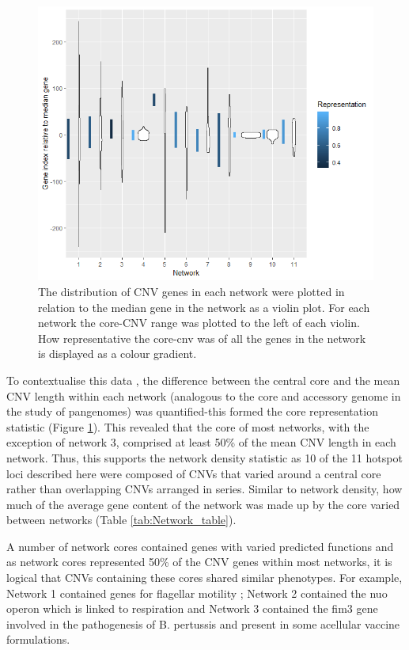 \documentclass{article}
\begin{document}
\begin{figure}[h!]
\centering
\includegraphics[width=\textwidth{}]{Chapter_1/Rplot135.png}
\caption{ The distribution of CNV genes in each network were plotted in relation to the median gene in the network as a violin plot. For each network the core-CNV range was plotted to the left of each violin. How representative the core-cnv was of all the genes in the network is displayed as a colour gradient.}
\label{fig:Core_rep}
\end{figure}



To contextualise this data , the difference between the central core and the mean CNV length within each network (analogous to the core and accessory genome in the study of pangenomes) was quantified-this formed the core representation statistic (Figure \ref{fig:Core_rep}). This revealed that the core of most networks, with the exception of network 3, comprised at least 50\% of the mean CNV length  in each network. Thus, this supports the network density statistic as  10 of the 11  hotspot loci described here were composed of CNVs that varied around a central core rather than overlapping CNVs arranged in series.  Similar to network density, how much of the average gene content of the network was made up by the core varied between networks (Table \ref{tab:Network_table}).

A number of network cores contained genes with varied predicted functions and as network cores represented 50\% of the CNV genes within most networks, it is logical that CNVs containing these cores shared similar phenotypes. For example, Network 1 contained genes for flagellar motility ; Network 2 contained the nuo operon which is linked to respiration and Network 3 contained the fim3 gene involved in the pathogenesis of B. pertussis and present in some acellular vaccine formulations.
\end{document}
